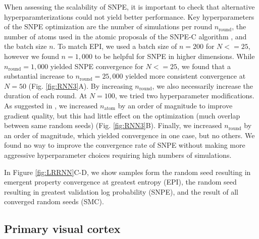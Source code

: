 \documentclass[11pt]{article}
\begin{document}
When assessing the scalability of SNPE, it is important to check that alternative hyperparamterizations could not yield better performance.
Key hyperparameters of the SNPE optimization are the number of simulations per round $n_{\text{round}}$, the number of atoms used in the atomic proposals of the SNPE-C algorithm \cite{greenberg2019automatic}, and the batch size $n$.
To match EPI, we used a batch size of $n = 200$ for $N <= 25$, however we found $n=1,000$ to be helpful for SNPE in higher dimensions.
While $n_{\text{round}} = 1,000$ yielded SNPE convergence for $N <= 25$, we found that a substantial increase to $n_{\text{round}} = 25,000$ yielded more consistent convergence at $N=50$ (Fig. \ref{fig:RNN3}A).
By increasing $n_{\text{round}}$, we also necessarily increase the duration of each round.
At $N=100$, we tried two hyperparameter modifications.
As suggested in \cite{greenberg2019automatic}, we increased $n_{\text{atom}}$ by an order of magnitude to improve gradient quality, but this had little effect on the optimization (much overlap between same random seeds) (Fig. \ref{fig:RNN3}B).
Finally, we increased $n_{\text{round}}$ by an order of magnitude, which yielded convergence in one case, but no others.
We found no way to improve the convergence rate of SNPE without making more aggressive hyperparameter choices requiring high numbers of simulations.

In Figure \ref{fig:LRRNN}C-D, we show samples form the random seed resulting in emergent property convergence at greatest entropy (EPI), the random seed resulting in greatest validation log probability (SNPE), and the result of all converged random seeds (SMC).


\subsection{Primary visual cortex}\label{methods_V1}
\end{document}
